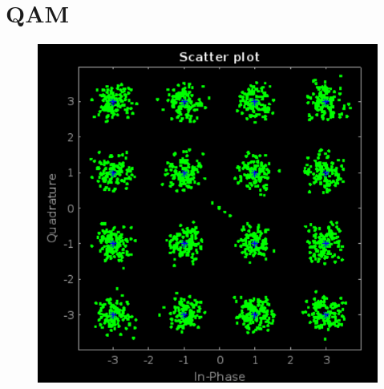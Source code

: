 \chapter{QAM}
\label{section:qam}




\vspace{3mm}

    \begin{figure}[h]
    	\centering
    	\includegraphics[width=1\textwidth]{img/matlab/qam.PNG}
    	\caption{}
    	\label{fig:qam}
    \end{figure}
    
\vspace{3mm}




